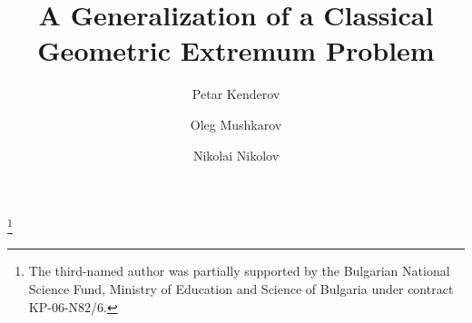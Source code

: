 \documentclass[a4paper,12pt]{amsart}
\begin{document}
\title{A Generalization of a Classical Geometric Extremum Problem}

\author{Petar Kenderov}
\address{P. Kenderov\\Institute of Mathematics and Informatics\\Bulgarian Academy
of Sciences\\Acad. G. Bonchev 8, 1113 Sofia, Bulgaria}

\author{Oleg Mushkarov}
\address{O. Mushkarov\\Institute of Mathematics and Informatics\\Bulgarian Academy
of Sciences\\Acad. G. Bonchev 8, 1113 Sofia, Bulgaria}


\author{Nikolai Nikolov}
\address{N. Nikolov\\Institute of Mathematics and Informatics\\Bulgarian Academy
of Sciences\\Acad. G. Bonchev 8, 1113 Sofia, Bulgaria \vspace{1mm}
\newline Faculty of Information Sciences\\
State University of Library Studies and Information Technologies\\
Shipchenski prohod 69A, 1574 Sofia, Bulgaria}


\thanks{The third-named author was partially supported by the Bulgarian National
Science Fund, Ministry of Education and Science of Bulgaria under contract KP-06-N82/6.}


\end{document}
